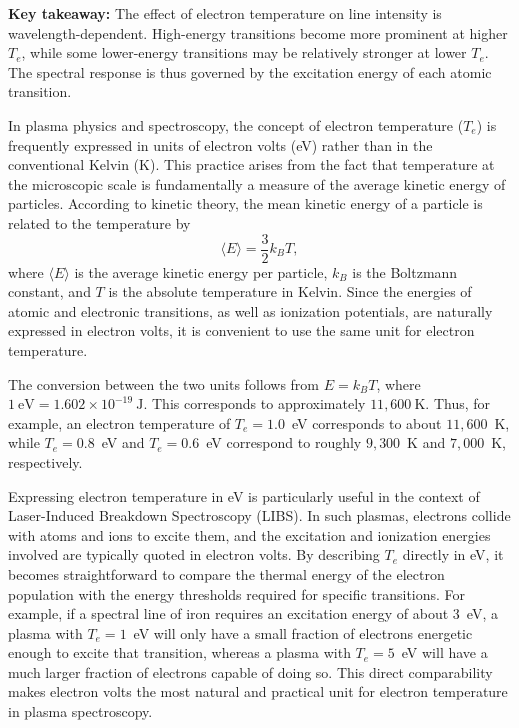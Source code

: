 \documentclass[12pt,a4paper]{article}
\begin{document}
	\textbf{Key takeaway:} The effect of electron temperature on line intensity is wavelength-dependent. High-energy transitions become more prominent at higher $T_e$, while some lower-energy transitions may be relatively stronger at lower $T_e$. The spectral response is thus governed by the excitation energy of each atomic transition.
	
	
	In plasma physics and spectroscopy, the concept of electron temperature ($T_e$) is frequently expressed in units of electron volts (eV) rather than in the conventional Kelvin (K). This practice arises from the fact that temperature at the microscopic scale is fundamentally a measure of the average kinetic energy of particles. According to kinetic theory, the mean kinetic energy of a particle is related to the temperature by  
	\[
	\langle E \rangle = \frac{3}{2} k_B T,
	\]  
	where $\langle E \rangle$ is the average kinetic energy per particle, $k_B$ is the Boltzmann constant, and $T$ is the absolute temperature in Kelvin. Since the energies of atomic and electronic transitions, as well as ionization potentials, are naturally expressed in electron volts, it is convenient to use the same unit for electron temperature.  
	
	The conversion between the two units follows from $E = k_B T$, where $1~\text{eV} = 1.602 \times 10^{-19}~\text{J}$. This corresponds to approximately $11{,}600~\text{K}$. Thus, for example, an electron temperature of $T_e = 1.0$~eV corresponds to about $11{,}600$~K, while $T_e = 0.8$~eV and $T_e = 0.6$~eV correspond to roughly $9{,}300$~K and $7{,}000$~K, respectively.  
	
	Expressing electron temperature in eV is particularly useful in the context of Laser-Induced Breakdown Spectroscopy (LIBS). In such plasmas, electrons collide with atoms and ions to excite them, and the excitation and ionization energies involved are typically quoted in electron volts. By describing $T_e$ directly in eV, it becomes straightforward to compare the thermal energy of the electron population with the energy thresholds required for specific transitions. For example, if a spectral line of iron requires an excitation energy of about 3~eV, a plasma with $T_e = 1$~eV will only have a small fraction of electrons energetic enough to excite that transition, whereas a plasma with $T_e = 5$~eV will have a much larger fraction of electrons capable of doing so. This direct comparability makes electron volts the most natural and practical unit for electron temperature in plasma spectroscopy.
	
\end{document}
